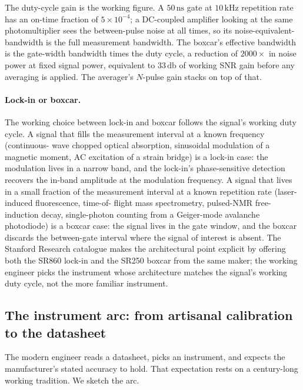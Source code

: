 The duty-cycle gain is the working figure. A
$50 \,\si{\nano\second}$ gate at $10 \,\si{\kilo\hertz}$ repetition
rate has an on-time fraction of $5 \times 10^{-4}$; a
DC-coupled amplifier looking at the same photomultiplier sees the
between-pulse noise at all times, so its noise-equivalent-bandwidth
is the full measurement bandwidth. The boxcar's effective bandwidth
is the gate-width bandwidth times the duty cycle, a reduction of
$2000\times$ in noise power at fixed signal power, equivalent to
$33 \,\si{\decibel}$ of working SNR gain before any averaging is
applied. The averager's $N$-pulse gain stacks on top of that.

\paragraph{Lock-in or boxcar.} The working choice between lock-in
and boxcar follows the signal's working duty cycle. A signal that
fills the measurement interval at a known frequency (continuous-
wave chopped optical absorption, sinusoidal modulation of a magnetic
moment, AC excitation of a strain bridge) is a lock-in case: the
modulation lives in a narrow band, and the lock-in's phase-sensitive
detection recovers the in-band amplitude at the modulation frequency.
A signal that lives in a small fraction of the measurement interval
at a known repetition rate (laser-induced fluorescence, time-of-
flight mass spectrometry, pulsed-NMR free-induction decay,
single-photon counting from a Geiger-mode avalanche photodiode) is
a boxcar case: the signal lives in the gate window, and the boxcar
discards the between-gate interval where the signal of interest is
absent. The Stanford Research catalogue makes the architectural
point explicit by offering both the SR860 lock-in and the SR250
boxcar from the same maker; the working engineer picks the
instrument whose architecture matches the signal's working duty
cycle, not the more familiar instrument.

\subsection{The instrument arc: from artisanal calibration to the
datasheet}

The modern engineer reads a datasheet, picks an instrument, and
expects the manufacturer's stated accuracy to hold. That
expectation rests on a century-long working tradition. We sketch
the arc.


